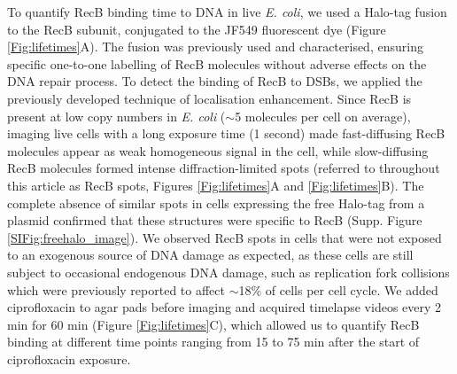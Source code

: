 To quantify RecB binding time to DNA in live \textit{E. coli}, we used a Halo-tag fusion to the RecB subunit, conjugated to the JF549 fluorescent dye (Figure \ref{Fig:lifetimes}A). The fusion was previously used and characterised, ensuring specific one-to-one labelling of RecB molecules without adverse effects on the DNA repair process.\cite{Lepore2019a,Lepore2023} To detect the binding of RecB to DSBs, we applied the previously developed technique of localisation enhancement.\cite{Yu2006, Elf2007} Since RecB is present at low copy numbers in \textit{E. coli} ($\sim$5 molecules per cell on average\cite{Lepore2019a}), imaging live cells with a long exposure time (1 second) made fast-diffusing RecB molecules appear as weak homogeneous signal in the cell, while slow-diffusing RecB molecules formed intense diffraction-limited spots (referred to throughout this article as RecB spots, Figures \ref{Fig:lifetimes}A and \ref{Fig:lifetimes}B). The complete absence of similar spots in cells expressing the free Halo-tag from a plasmid confirmed that these structures were specific to RecB (Supp. Figure \ref{SIFig:freehalo_image}). We observed RecB spots in cells that were not exposed to an exogenous source of DNA damage as expected, as these cells are still subject to occasional endogenous DNA damage, such as replication fork collisions which were previously reported to affect $\sim$18\% of cells per cell cycle.\cite{Sinha2018} We added ciprofloxacin to agar pads before imaging and acquired timelapse videos every 2 min for 60 min (Figure \ref{Fig:lifetimes}C), which allowed us to quantify RecB binding at different time points ranging from 15 to 75 min after the start of ciprofloxacin exposure.

